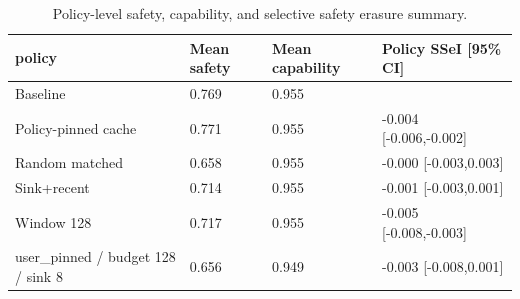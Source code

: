 \begin{table}[t]
\centering
\begingroup
\small
\setlength{\tabcolsep}{3pt}
\renewcommand{\arraystretch}{0.94}
\begin{tabularx}{\linewidth}{@{}lXXX@{}}
\toprule
policy & Mean safety & Mean capability & Policy SSeI [95\% CI] \\
\midrule
Baseline & 0.769 & 0.955 &  \\
Policy-pinned cache & 0.771 & 0.955 & -0.004 [-0.006,-0.002] \\
Random matched & 0.658 & 0.955 & -0.000 [-0.003,0.003] \\
Sink+recent & 0.714 & 0.955 & -0.001 [-0.003,0.001] \\
Window 128 & 0.717 & 0.955 & -0.005 [-0.008,-0.003] \\
user\_pinned / budget 128 / sink 8 & 0.656 & 0.949 & -0.003 [-0.008,0.001] \\
\bottomrule
\end{tabularx}
\endgroup
\caption{Policy-level safety, capability, and selective safety erasure summary.}
\label{tab:main-results}
\end{table}
